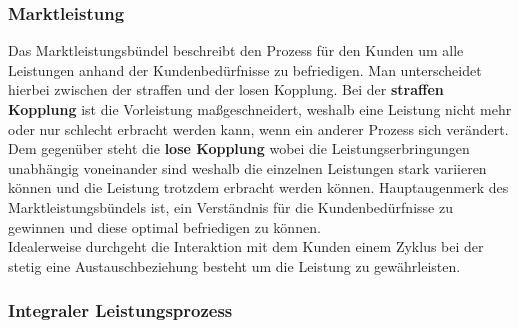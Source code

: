 \documentclass{article}
\begin{document}
  \subsubsection{Marktleistung}
  Das Marktleistungsbündel beschreibt den Prozess für den Kunden um alle Leistungen anhand der Kundenbedürfnisse zu befriedigen. Man unterscheidet hierbei zwischen der straffen und der losen Kopplung. Bei der \textbf{straffen Kopplung} ist die Vorleistung maßgeschneidert, weshalb eine Leistung nicht mehr oder nur schlecht erbracht werden kann, wenn ein anderer Prozess sich verändert. Dem gegenüber steht die \textbf{lose Kopplung} wobei die Leistungserbringungen unabhängig voneinander sind weshalb die einzelnen Leistungen stark variieren können und die Leistung trotzdem erbracht werden können. Hauptaugenmerk des Marktleistungsbündels ist, ein Verständnis für die Kundenbedürfnisse zu gewinnen und diese optimal befriedigen zu können. \\
  Idealerweise durchgeht die Interaktion mit dem Kunden einem Zyklus bei der stetig eine Austauschbeziehung besteht um die Leistung zu gewährleisten.
  \subsubsection{Integraler Leistungsprozess}
\end{document}
